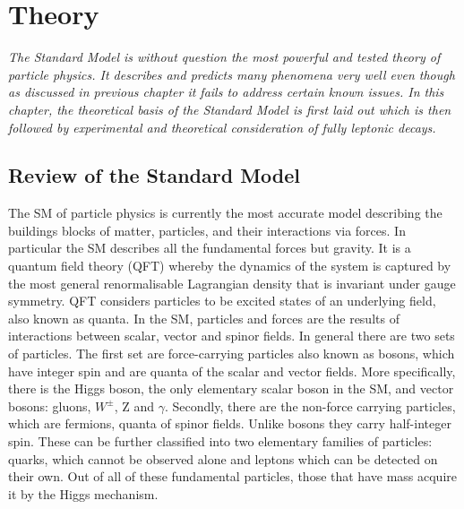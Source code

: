 \chapter{Theory}
\label{stheory}
\textit{The Standard Model is without question the most powerful and tested theory of particle physics. It describes and predicts many phenomena very well even though as discussed in previous chapter it fails to address certain known issues. In this chapter, the theoretical basis of the Standard Model is first laid out which is then followed by experimental and theoretical consideration of fully leptonic decays.}



\section{Review of the Standard Model}
The \gls{SM} of particle physics is currently the most accurate model describing the buildings blocks of matter, particles, and their interactions via forces. In particular the \gls{SM} describes all the fundamental forces but gravity. It is a quantum field theory (\gls{QFT}) whereby the dynamics of the system is captured by the most general renormalisable Lagrangian density that is invariant under gauge symmetry. \gls{QFT} considers particles to be excited states of an underlying field, also known as quanta. In the \gls{SM}, particles and forces are the results of interactions between scalar, vector and spinor fields. In general there are two sets of particles. The first set are force-carrying particles also known as bosons, which have integer spin and are quanta of the scalar and vector fields. More specifically, there is the Higgs boson, the only elementary scalar boson in the \gls{SM}, and vector bosons: gluons, $W^{\pm}$, Z and $\gamma$. Secondly, there are the non-force carrying particles, which are fermions, quanta of spinor fields. Unlike bosons they carry half-integer spin. These can be further classified into two elementary families of particles: quarks, which cannot be observed alone and leptons which can be detected on their own. Out of all of these fundamental particles, those that have mass acquire it by the Higgs mechanism.


